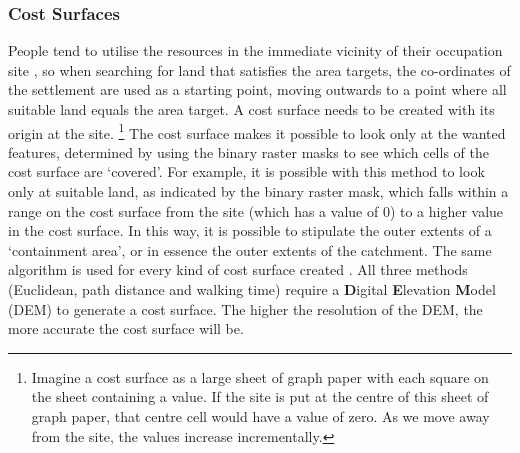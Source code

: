 \subsubsection{Cost Surfaces}
	\label{costSurfaces}
People tend to utilise the resources in the immediate vicinity %
of their occupation site \citep[469]{Browman1976}, so when searching for land that satisfies the area targets, the co-ordinates of the settlement are used as a starting point, moving outwards to a point where all suitable land equals the area target. %
A cost surface needs to be created with its origin at the site. \footnote{Imagine a cost surface as a large sheet of graph paper with each square on the sheet containing a value. If the site is put at the centre of this sheet of graph paper, that centre cell would have a value of zero. As we move away from the site, the values increase incrementally.} The cost surface makes it possible to look only at the wanted features, determined by using the binary raster masks to see which cells of the cost surface are `covered'.  For example, it is possible with this method to look only at suitable land, as indicated by the binary raster mask, which falls within a range on the cost surface from the site (which has a value of 0) to a higher value in the cost surface.  In this way, it is possible to stipulate the outer extents of a `containment area', or in essence the outer extents of the catchment.  The same algorithm is used for every kind of cost surface created .  All three methods (Euclidean, path distance and walking time) require a \textbf{D}igital \textbf{E}levation \textbf{M}odel (DEM) to generate a cost surface. The higher the resolution of the DEM, the more accurate the cost surface will be.

